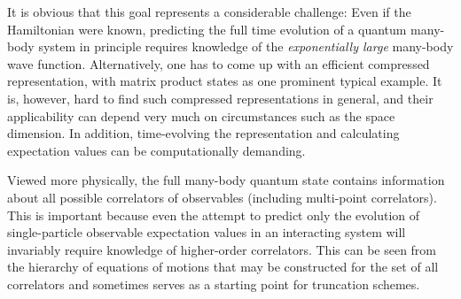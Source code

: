 \documentclass[a4paper,aps,amsmath,amssymb,twocolumn,longbibliography,,accepted=2022-05-17]{quantumarticle}
\begin{document}

It is obvious that this goal represents a considerable challenge: Even if the Hamiltonian were known, predicting the full time evolution of a quantum many-body system in principle requires knowledge of the \textit{exponentially large} many-body wave function. Alternatively, one has to come up with an efficient compressed representation, with matrix product states \cite{orus2014practical} as one prominent typical example. It is, however, hard to find such compressed representations in general, and their applicability can depend very much on circumstances such as the space dimension. In addition, time-evolving the representation and calculating expectation values can be computationally demanding.

Viewed more physically, the full many-body quantum state contains information about all possible correlators of observables (including multi-point correlators). This is important because even the attempt to predict only the evolution of single-particle observable expectation values in an interacting system will invariably require knowledge of higher-order correlators. This can be seen from the hierarchy of equations of motions that may be constructed for the set of all correlators and sometimes serves as a starting point for truncation schemes.
\end{document}
